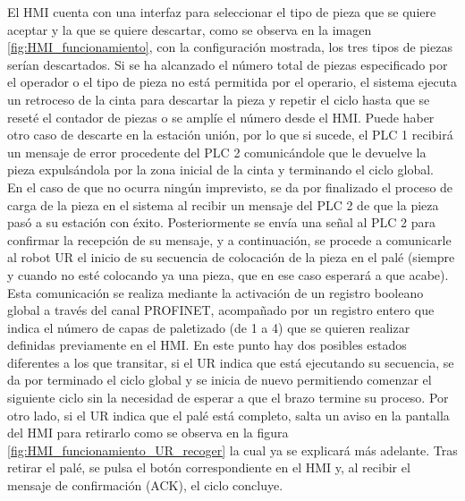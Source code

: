  El HMI cuenta con una interfaz para seleccionar el tipo de pieza que se quiere aceptar y la que se quiere descartar, como se observa en la imagen \ref{fig:HMI_funcionamiento}, con la configuración mostrada, los tres tipos de piezas serían descartados. Si se ha alcanzado el número total de piezas especificado por el operador o el tipo de pieza no está permitida por el operario, el sistema ejecuta un retroceso de la cinta para descartar la pieza y repetir el ciclo hasta que se reseté el contador de piezas o se amplíe el número desde el HMI. Puede haber otro caso de descarte en la estación unión, por lo que si sucede, el PLC 1 recibirá un mensaje de error procedente del PLC 2 comunicándole que le devuelve la pieza expulsándola por la zona inicial de la cinta y terminando el ciclo global. \\
 
En el caso de que no ocurra ningún imprevisto, se da por finalizado el proceso de carga de la pieza en el sistema al recibir un mensaje del PLC 2 de que la pieza pasó a su estación con éxito. Posteriormente se envía una señal al PLC 2 para confirmar la recepción de su mensaje, y a continuación, se procede a comunicarle al robot UR el inicio de su secuencia de colocación de la pieza en el palé (siempre y cuando no esté colocando ya una pieza, que en ese caso esperará a que acabe). Esta comunicación se realiza mediante la activación de un registro booleano global a través del canal PROFINET, acompañado por un registro entero que indica el número de capas de paletizado (de 1 a 4) que se quieren realizar definidas previamente en el HMI. En este punto hay dos posibles estados diferentes a los que transitar, si el UR indica que está ejecutando su secuencia, se da por terminado el ciclo global y se inicia de nuevo permitiendo comenzar el siguiente ciclo sin la necesidad de esperar a que el brazo termine su proceso. Por otro lado, si el UR indica que el palé está completo, salta un aviso en la pantalla del HMI para retirarlo como se observa en la figura \ref{fig:HMI_funcionamiento_UR_recoger} la cual ya se explicará más adelante. Tras retirar el palé, se pulsa el botón correspondiente en el HMI y, al recibir el mensaje de confirmación (ACK), el ciclo concluye.

\clearpage

